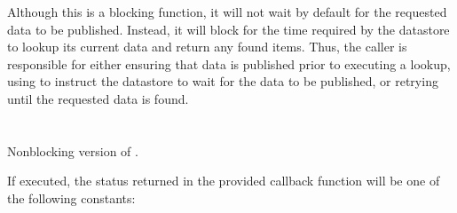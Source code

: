 \adviceuserstart
Although this is a blocking function, it will not wait by default for the requested data to be published.
Instead, it will block for the time required by the datastore to lookup its current data and return any found items.
Thus, the caller is responsible for either ensuring that data is published prior to executing a lookup, using  to instruct the datastore to wait for the data to be published, or retrying until the requested data is found.
\adviceuserend


\section{}

\summary

Nonblocking version of .

\format


\begin{arglist}
\end{arglist}

\returnsimplenb

If executed, the status returned in the provided callback function will be one of the following constants:

